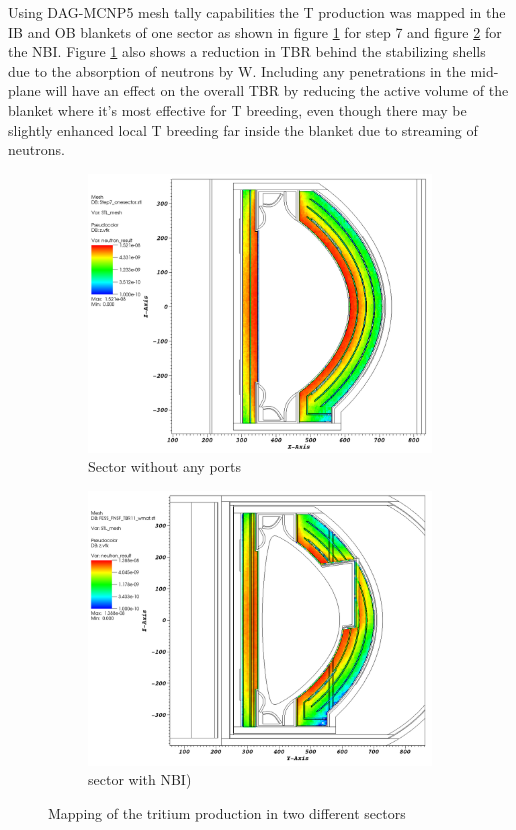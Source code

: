 \documentclass[12pt, letterpaper]{elsarticle}
\begin{document}
Using DAG-MCNP5 mesh tally capabilities the T production was mapped in the IB and OB blankets of one sector as shown in figure \ref{fig:step7} for step 7 and figure \ref{fig:NBI} for the NBI. Figure \ref{fig:step7} also shows a reduction in TBR behind the stabilizing shells due to the absorption of neutrons by W. Including any penetrations in the mid-plane will have an effect on the overall TBR by reducing the active volume of the blanket where it's most effective for T breeding, even though there may be slightly enhanced local T breeding far inside the blanket due to streaming of neutrons.
\begin{figure}[h!]
\centering
\begin{subfigure}{0.4\textwidth}
  \centering
  \includegraphics[width = \textwidth]{../plots/step7.png}
  \caption{Sector without any ports}
  \label{fig:step7}
\end{subfigure}
\begin{subfigure}{0.4\textwidth}
  \centering
  \includegraphics[width = \textwidth]{../plots/NBI.png}
  \caption{sector with NBI)}
  \label{fig:NBI}
\end{subfigure}
\caption{Mapping of the tritium production in two different sectors}
\label{fig:TBR mapping}
\end{figure}
\end{document}
